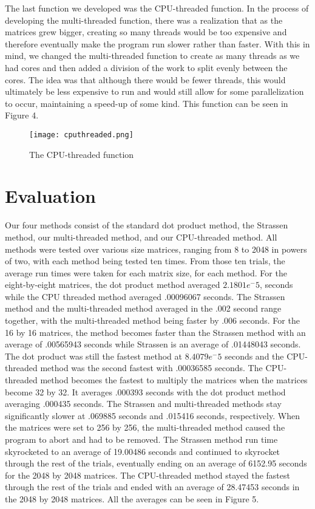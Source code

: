 \documentclass[conference]{IEEEtran}
\begin{document}
    The last function we developed was the CPU-threaded function. In the process of developing the multi-threaded function, there was a realization that as the matrices grew bigger, creating so many threads would be too expensive and therefore eventually make the program run slower rather than faster. With this in mind, we changed the multi-threaded function to create as many threads as we had cores and then added a division of the work to split evenly between the cores. The idea was that although there would be fewer threads, this would ultimately be less expensive to run and would still allow for some parallelization to occur, maintaining a speed-up of some kind. This function can be seen in Figure 4.

    \begin{figure}
        \centering
        \texttt{[image: cputhreaded.png]}
        \caption{The CPU-threaded function}
        \label{fig:cputhreaded}
    \end{figure}
    

\section{Evaluation}    
    Our four methods consist of the standard dot product method, the Strassen method, our multi-threaded method, and our CPU-threaded method. All methods were tested over various size matrices, ranging from 8 to 2048 in powers of two, with each method being tested ten times. From those ten trials, the average run times were taken for each matrix size, for each method. For the eight-by-eight matrices, the dot product method averaged \(2.1801e^-5\), seconds while the CPU threaded method averaged .00096067 seconds. The Strassen method and the multi-threaded method averaged in the .002 second range together, with the multi-threaded method being faster by .006 seconds. For the 16 by 16 matrices, the  method becomes faster than the  Strassen method with an average of .00565943 seconds while Strassen is an average of .01448043 seconds. The dot product was still the fastest method at \(8.4079e^-5\) seconds and the CPU-threaded method was the second fastest with .00036585 seconds. The CPU-threaded method becomes the fastest to multiply the matrices when the matrices become 32 by 32. It averages .000393 seconds with the dot product method averaging .000435 seconds. The Strassen and multi-threaded methods stay significantly slower at .069885 seconds and .015416 seconds, respectively. When the matrices were set to 256 by 256, the multi-threaded method caused the program to abort and had to be removed. The Strassen method run time skyrocketed to an average of 19.00486 seconds and continued to skyrocket through the rest of the trials, eventually ending on an average of 6152.95 seconds for the 2048 by 2048 matrices. The CPU-threaded method stayed the fastest through the rest of the trials and ended with an average of 28.47453 seconds in the 2048 by 2048 matrices. All the averages can be seen in Figure 5.
\end{document}

